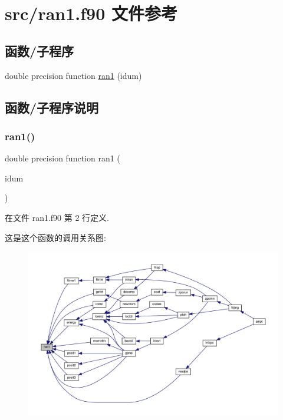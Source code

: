 \hypertarget{ran1_8f90}{}\section{src/ran1.f90 文件参考}
\label{ran1_8f90}
\subsection*{函数/子程序}
\begin{DoxyCompactItemize}
\item 
double precision function \mbox{\hyperlink{ran1_8f90_a63354d360c29776e007208f0833905a9}{ran1}} (idum)
\end{DoxyCompactItemize}


\subsection{函数/子程序说明}
\mbox{\label{ran1_8f90_a63354d360c29776e007208f0833905a9}} 
\subsubsection{\texorpdfstring{ran1()}{ran1()}}
{\footnotesize\ttfamily double precision function ran1 (\begin{DoxyParamCaption}\item[{}]{idum }\end{DoxyParamCaption})}



在文件 ran1.\+f90 第 2 行定义.

这是这个函数的调用关系图\+:
\nopagebreak
\begin{figure}[H]
\begin{center}
\leavevmode
\includegraphics[width=350pt]{ran1_8f90_a63354d360c29776e007208f0833905a9_icgraph}
\end{center}
\end{figure}
